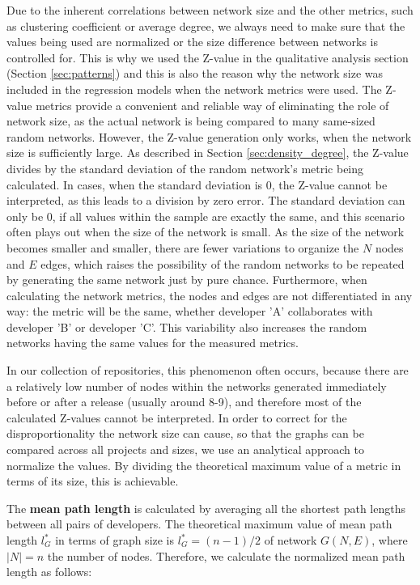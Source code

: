 Due to the inherent correlations between network size and the other metrics, such as clustering coefficient or average degree, we always need to make sure that the values being used are normalized or the size difference between networks is controlled for. This is why we used the Z-value in the qualitative analysis section (Section \ref{sec:patterns}) and this is also the reason why the network size was included in the regression models when the network metrics were used. The Z-value metrics provide a convenient and reliable way of eliminating the role of network size, as the actual network is being compared to many same-sized random networks. However, the Z-value generation only works, when the network size is sufficiently large. As described in Section \ref{sec:density_degree}, the Z-value divides by the standard deviation of the random network's metric being calculated. In cases, when the standard deviation is $0$, the Z-value cannot be interpreted, as this leads to a division by zero error. The standard deviation can only be $0$, if all values within the sample are exactly the same, and this scenario often plays out when the size of the network is small. As the size of the network becomes smaller and smaller, there are fewer variations to organize the $N$ nodes and $E$ edges, which raises the possibility of the random networks to be repeated by generating the same network just by pure chance. Furthermore, when calculating the network metrics, the nodes and edges are not differentiated in any way: the metric will be the same, whether developer 'A' collaborates with developer 'B' or developer 'C'. This variability also increases the random networks having the same values for the measured metrics.

In our collection of repositories, this phenomenon often occurs, because there are a relatively low number of nodes within the networks generated immediately before or after a release (usually around 8-9), and therefore most of the calculated Z-values cannot be interpreted. In order to correct for the disproportionality the network size can cause, so that the graphs can be compared across all projects and sizes, we use an analytical approach to normalize the values. By dividing the theoretical maximum value of a metric in terms of its size, this is achievable.

The \textbf{mean path length} is calculated by averaging all the shortest path lengths between all pairs of developers. The theoretical maximum value of mean path length $l_G^*$ in terms of graph size is $l_G^* = (n-1)/2$ of network $G(N,E)$, where $|N| = n$ the number of nodes. Therefore, we calculate the normalized mean path length as follows:

